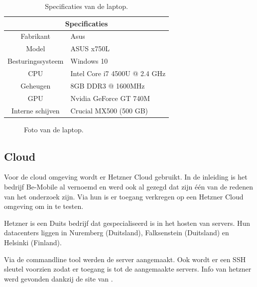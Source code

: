 \begin{table}
	\centering
	\begin{tabular}{c l}
		\hline
		\multicolumn{2}{c}{\textbf{Specificaties}} \\
		\hline
		Fabrikant & Asus \\
		\hline
		Model & ASUS x750L \\
		\hline		
        Besturingssysteem & Windows 10\\
        \hline
		CPU & Intel Core i7 4500U @ 2.4 GHz  \\
		\hline
		Geheugen & 8GB DDR3 @ 1600MHz \\
		\hline
		GPU & Nvidia GeForce GT 740M \\
		\hline
		Interne schijven & Crucial MX500 (500 GB) \\
		\hline
	\end{tabular}
	\caption{Specificaties van de laptop.}
	\label{tab:specs_desktop }
\end{table}

\begin{figure}[!htb]
	\caption{Foto van de laptop.}
	\label{fig:asustest}
\end{figure}

\subsection{Cloud}
Voor de cloud omgeving wordt er Hetzner Cloud gebruikt. In de inleiding is het bedrijf Be-Mobile al vernoemd en werd ook al gezegd dat zijn één van de redenen van het onderzoek zijn. Via hun is er toegang verkregen op een Hetzner Cloud omgeving om in te testen. 

Hetzner is een Duits bedrijf dat gespecialiseerd is in het hosten van servers. Hun datacenters liggen in Nuremberg (Duitsland), Falksenstein (Duitsland) en Helsinki (Finland). 

Via de commandline tool werden de server aangemaakt. Ook wordt er een SSH sleutel voorzien zodat er toegang is tot de aangemaakte servers. Info van hetzner werd gevonden dankzij de site van \autocite{hetzner}.


